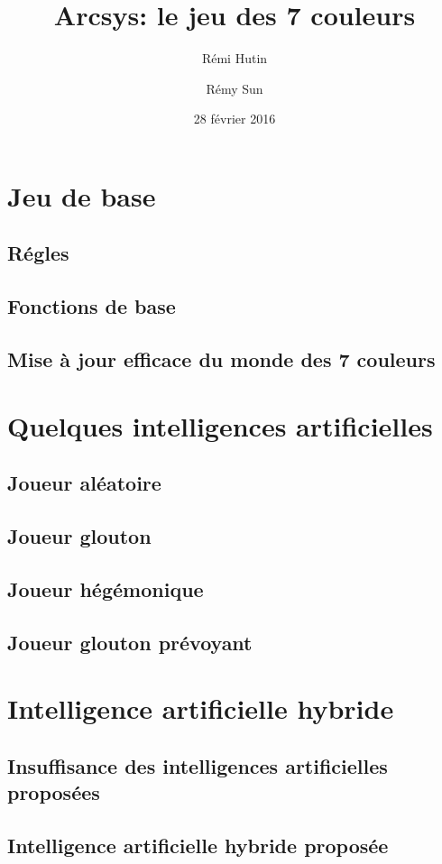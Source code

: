 \documentclass[a4paper,11pt]{article}
\title{Arcsys: le jeu des 7 couleurs}
\author{Rémi Hutin \and Rémy Sun}
\date{28 février 2016}
\begin{document}
\maketitle

\begin{abstract}
  
\end{abstract}

\section{Jeu de base}

\subsection{Régles}

\subsection{Fonctions de base}

\subsection{Mise à jour efficace du monde des 7 couleurs}

\section{Quelques intelligences artificielles}

\subsection{Joueur aléatoire}

\subsection{Joueur glouton}

\subsection{Joueur hégémonique}

\subsection{Joueur glouton prévoyant}


\section{Intelligence artificielle hybride}

\subsection{Insuffisance des intelligences artificielles proposées}

\subsection{Intelligence artificielle hybride proposée}
\end{document}
